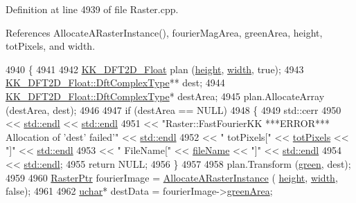 Definition at line 4939 of file Raster.\+cpp.



References Allocate\+A\+Raster\+Instance(), fourier\+Mag\+Area, green\+Area, height, tot\+Pixels, and width.


\begin{DoxyCode}
4940 \{
4941 
4942   \hyperlink{class_k_k_b_1_1_k_k___d_f_t2_d}{KK\_DFT2D\_Float}  plan (\hyperlink{class_k_k_b_1_1_raster_af39ff189de4fbb6de98392e187efafb7}{height}, \hyperlink{class_k_k_b_1_1_raster_ae0bcc103e191c3421d7692dc69ceb554}{width}, \textcolor{keyword}{true});
4943   \hyperlink{class_k_k_b_1_1_k_k___d_f_t2_d_a3277abaea54d0d88958f030092b9ac38}{KK\_DFT2D\_Float::DftComplexType}**  dest;
4944   \hyperlink{class_k_k_b_1_1_k_k___d_f_t2_d_a3277abaea54d0d88958f030092b9ac38}{KK\_DFT2D\_Float::DftComplexType}*   destArea;
4945   plan.AllocateArray (destArea, dest);
4946 
4947   \textcolor{keywordflow}{if}  (destArea == NULL)
4948   \{
4949     std::cerr 
4950         << \hyperlink{namespace_k_k_b_ad1f50f65af6adc8fa9e6f62d007818a8}{std::endl} << \hyperlink{namespace_k_k_b_ad1f50f65af6adc8fa9e6f62d007818a8}{std::endl}
4951         << \textcolor{stringliteral}{"Raster::FastFourierKK   ***ERROR***    Allocation of 'dest' failed'"} << 
      \hyperlink{namespace_k_k_b_ad1f50f65af6adc8fa9e6f62d007818a8}{std::endl}
4952         << \textcolor{stringliteral}{"              totPixels["} << \hyperlink{class_k_k_b_1_1_raster_a9b08c4a0ca0a35435a478599635f1dc0}{totPixels} << \textcolor{stringliteral}{"]"}    << 
      \hyperlink{namespace_k_k_b_ad1f50f65af6adc8fa9e6f62d007818a8}{std::endl}
4953         << \textcolor{stringliteral}{"              FileName["} << \hyperlink{class_k_k_b_1_1_raster_a742e1da027493443f2dda570a89fe2e9}{fileName}   << \textcolor{stringliteral}{"]"}    << 
      \hyperlink{namespace_k_k_b_ad1f50f65af6adc8fa9e6f62d007818a8}{std::endl}
4954         << \hyperlink{namespace_k_k_b_ad1f50f65af6adc8fa9e6f62d007818a8}{std::endl};
4955     \textcolor{keywordflow}{return} NULL;
4956   \}
4957 
4958   plan.Transform (\hyperlink{class_k_k_b_1_1_raster_a2d2238911145488e226cd2e34fc8448c}{green}, dest);
4959 
4960   \hyperlink{class_k_k_b_1_1_raster}{RasterPtr} fourierImage = \hyperlink{class_k_k_b_1_1_raster_aa879980d112c01cb7ad9a3cfc7cd6f64}{AllocateARasterInstance} (
      \hyperlink{class_k_k_b_1_1_raster_af39ff189de4fbb6de98392e187efafb7}{height}, \hyperlink{class_k_k_b_1_1_raster_ae0bcc103e191c3421d7692dc69ceb554}{width}, \textcolor{keyword}{false});
4961 
4962   \hyperlink{namespace_k_k_b_ace9969169bf514f9ee6185186949cdf7}{uchar}*  destData = fourierImage->\hyperlink{class_k_k_b_1_1_raster_ad981258f1f7284a8bd0cd0466f328cdf}{greenArea};

\end{DoxyCode}
